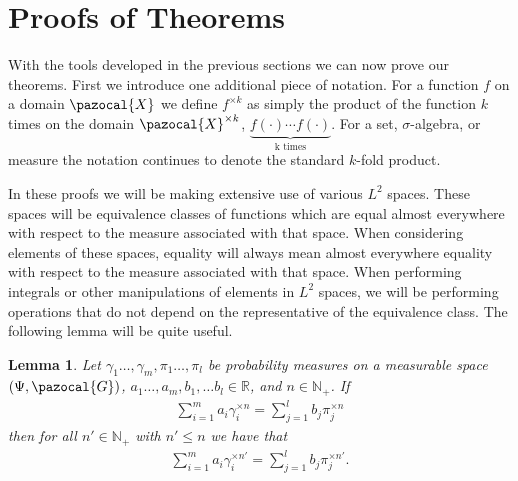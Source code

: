 \documentclass[aos,preprint]{imsart}
\def\rn{\mathbb{R}}
\def\sG{\pazocal{G}}
\def\sX{\pazocal{X}}
\theoremstyle{plain}
\newtheorem{lem}{Lemma}[section]
\theoremstyle{defintion}
\begin{document}
	\section{Proofs of Theorems}
	With the tools developed in the previous sections we can now prove our theorems. First we introduce one additional piece of notation. For a function $f$ on a domain $\sX$ we define $f^{\times k}$ as simply the product of the function $k$ times on the domain $\sX^{\times k}$, $\underbrace{f(\cdot)\cdots f(\cdot)}_{\text{k times}}$. For a set, $\sigma$-algebra, or measure the notation continues to denote the standard $k$-fold product.

	In these proofs we will be making extensive use of various $L^2$ spaces. These spaces will be equivalence classes of functions which are equal almost everywhere with respect to the measure associated with that space. When considering elements of these spaces, equality will always mean almost everywhere equality with respect to the measure associated with that space. When performing integrals or other manipulations of elements in $L^2$ spaces, we will be performing operations that do not depend on the representative of the equivalence class.
	The following lemma will be quite useful.
	\begin{lem}\label{lem:noidentdown}
		Let $\gamma_1\ldots,\gamma_m, \pi_1\ldots,\pi_l$ be probability measures on a measurable space $\left( \Psi,\sG \right)$, $a_1\ldots,a_m,b_1,\ldots b_l \in \rn$, and $n\in \mathbb{N}_+$. If
		\begin{eqnarray*}
			\sum_{i=1}^m a_i \gamma_i^{\times n} =  \sum_{j=1}^l b_j \pi_j^{\times n}
		\end{eqnarray*}
		then for all $n'\in \mathbb{N}_+$ with $n'\le n$ we have that
		\begin{eqnarray*}
			\sum_{i=1}^m a_i \gamma_i^{\times n'} =  \sum_{j=1}^l b_j \pi_j^{\times n'}.
		\end{eqnarray*}
	\end{lem}
\end{document}
